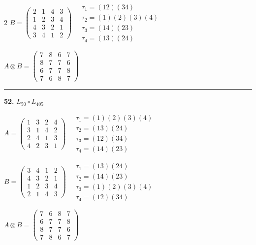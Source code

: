 \begin{multicols}{2}
$B = \begin{pmatrix} 2 & 1 & 4 & 3 \\ 1 & 2 & 3 & 4 \\ 4 & 3 & 2 & 1 \\ 3 & 4 & 1 & 2 \end{pmatrix} \quad \begin{matrix} \tau_{1}=(1 2)(3 4) \\ \tau_{2}=(1)(2)(3)(4) \\ \tau_{3}=(1 4)(2 3) \\ \tau_{4}=(1 3)(2 4) \end{matrix}$

$A \otimes B = \begin{pmatrix} 7 & 8 & 6 & 7 \\ 8 & 7 & 7 & 6 \\ 6 & 7 & 7 & 8 \\ 7 & 6 & 8 & 7 \end{pmatrix}$

\vspace{0.3em}
\hrule
\vspace{0.3em}

\noindent\textbf{52.} $L_{50} \circ L_{405}$

$A = \begin{pmatrix} 1 & 3 & 2 & 4 \\ 3 & 1 & 4 & 2 \\ 2 & 4 & 1 & 3 \\ 4 & 2 & 3 & 1 \end{pmatrix} \quad \begin{matrix} \tau_{1}=(1)(2)(3)(4) \\ \tau_{2}=(1 3)(2 4) \\ \tau_{3}=(1 2)(3 4) \\ \tau_{4}=(1 4)(2 3) \end{matrix}$

$B = \begin{pmatrix} 3 & 4 & 1 & 2 \\ 4 & 3 & 2 & 1 \\ 1 & 2 & 3 & 4 \\ 2 & 1 & 4 & 3 \end{pmatrix} \quad \begin{matrix} \tau_{1}=(1 3)(2 4) \\ \tau_{2}=(1 4)(2 3) \\ \tau_{3}=(1)(2)(3)(4) \\ \tau_{4}=(1 2)(3 4) \end{matrix}$

$A \otimes B = \begin{pmatrix} 7 & 6 & 8 & 7 \\ 6 & 7 & 7 & 8 \\ 8 & 7 & 7 & 6 \\ 7 & 8 & 6 & 7 \end{pmatrix}$


\end{multicols}
